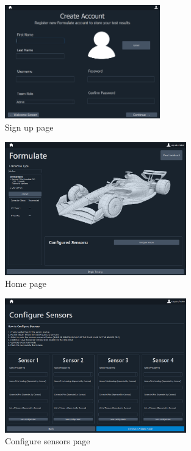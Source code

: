 \documentclass[12pt, titlepage]{article}
\begin{document}
  \begin{figure}[h!]
    \begin{center}
    \includegraphics[width=0.6\textwidth]{signup_page}
    \caption{Sign up page}
    \label{Fig_SystemContext} 
    \end{center}
    \end{figure}

  \begin{figure}[h!]
    \begin{center}
    \includegraphics[width=0.7\textwidth]{home_page}
    \caption{Home page}
    \label{Fig_SystemContext} 
    \end{center}
    \end{figure}


  \begin{figure}[h!]
    \begin{center}
    \includegraphics[width=0.7\textwidth]{configure_sensors_page}
    \caption{Configure sensors page}
    \label{Fig_SystemContext} 
    \end{center}
    \end{figure}
\end{document}
